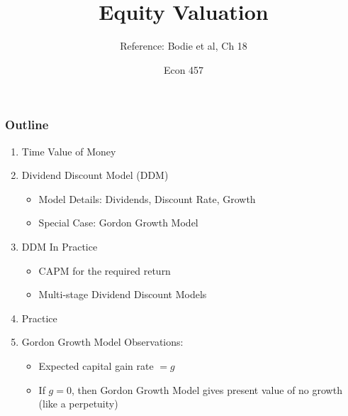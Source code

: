 \documentclass{beamer}
\title{Equity Valuation}
\subtitle{Reference: Bodie et al, Ch 18}
\author{Econ 457}
\date{\week}
\begin{document}
\frame{\titlepage}


\begin{frame}
    \frametitle{Outline}

    \begin{enumerate}
        \item Time Value of Money
        \item Dividend Discount Model (DDM) 
            \begin{itemize}
                \item Model Details: Dividends, Discount Rate, Growth
                \item Special Case: Gordon Growth Model
            \end{itemize}
        \item DDM In Practice
            \begin{itemize}
                \item CAPM for the required return
                \item Multi-stage Dividend Discount Models
            \end{itemize}
        \item Practice
        \item Gordon Growth Model Observations:
            \begin{itemize}
                \item Expected capital gain rate $=g$
                \item If $g=0$, then Gordon Growth Model gives present value of no growth (like a perpetuity)
            \end{itemize}
    \end{enumerate}

\end{frame}
\end{document}
